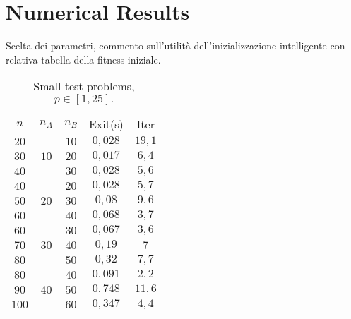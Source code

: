 \documentclass[opre,nonblindrev]{informs3} %
\begin{document}
\section{Numerical Results}
Scelta dei parametri, commento sull'utilità dell'inizializzazione intelligente con relativa tabella della fitness iniziale. 
\begin{table}[h]\scriptsize
	\begin{center}
		\begin{tabular}{|| c |c | c|| c||c ||}\hline
			
			\multirow{3}{*}{$n$} & \multirow{3}{*}{$n_A$} & \multirow{3}{*}{$n_B$} & \multirow{3}{*}{Exit(s)} & \multirow{3}{*}{Iter}\\
			&  &&  & \\
			&    &    &  &\\\hline
			$20$	 & \multirow{3}{*}{$10$}   & $10$   &$0,028$  & $19,1$
			\\
			$30$  &  & $20$	 & $0,017$
			&$6,4$
			\\ 
			$40$  &  & $30$	 & $0,028$
			&$5,6$
			\\ \hline
			
			$40$	 & \multirow{3}{*}{$20$}   & $20$   & $0,028$
			& $5,7$
			\\
			$50$  &  & $30$	 &$0,08$
			&$9,6$
			\\ 
			$60$  &  & $40$	 &$0,068$ &$3,7$\\ \hline
			
			$60$	 & \multirow{3}{*}{$30$}   & $30$   &  $0,067$
			& $3,6$
			\\
			$70$  &  & $40$	 &$0,19$
			&$7$
			\\ 
			$80$  &  & $50$	 & $0,32$
			&$7,7$
			\\ \hline
			
			$80$	 & \multirow{3}{*}{$40$}   & $40$   &  $0,091$
			&$2,2$
			\\
			$90$  &  & $50$	 & $0,748$
			&$11,6$
			\\ 
			$100$  &  & $60$	 & $0,347$
			&$4,4$
			\\ \hline 
		\end{tabular}
	\end{center}
	\caption{Small test problems, $p \in [1,25].$} \label{large}
\end{table}
\end{document}
